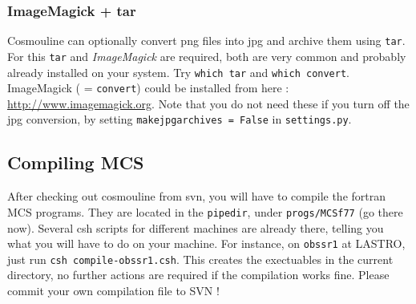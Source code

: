 \subsubsection{ImageMagick + tar}
Cosmouline can optionally convert png files into jpg and archive them using \verb+tar+. For this \verb+tar+ and \emph{ImageMagick} are required, both are very common and probably already installed on your system. Try \verb+which tar+ and \verb+which convert+. ImageMagick ( = \verb+convert+) could be installed from here :
\url{http://www.imagemagick.org}.
Note that you do not need these if you turn off the jpg conversion, by setting \verb+makejpgarchives = False+ in \verb+settings.py+.




\subsection{Compiling MCS}
After checking out cosmouline from svn, you will have to compile the fortran MCS programs. They are located in the \verb+pipedir+, under \verb+progs/MCSf77+ (go there now). Several csh scripts for different machines are already there, telling you what you will have to do on your machine. For instance, on \verb+obssr1+ at LASTRO, just run \verb+csh compile-obssr1.csh+. This creates the exectuables in the current directory, no further actions are required if the compilation works fine. Please commit your own compilation file to SVN !





%





